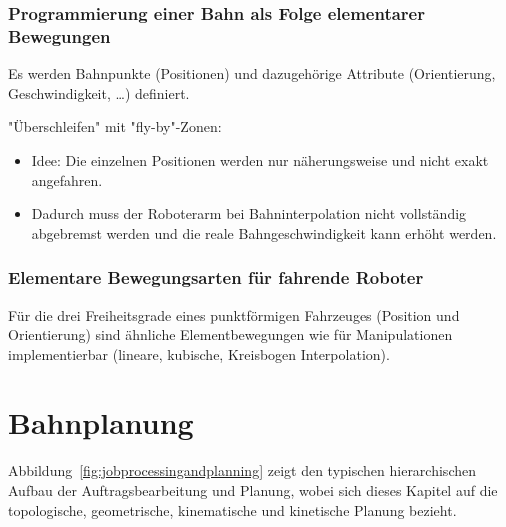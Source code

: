 		\subsection{Programmierung einer Bahn als Folge elementarer Bewegungen}
			Es werden Bahnpunkte (Positionen) und dazugehörige Attribute (Orientierung, Geschwindigkeit, \dots) definiert.

			"Überschleifen" mit "fly-by"-Zonen:
			\begin{itemize}
				\item Idee: Die einzelnen Positionen werden nur näherungsweise und nicht exakt angefahren.
				\item Dadurch muss der Roboterarm bei Bahninterpolation nicht vollständig abgebremst werden und die reale Bahngeschwindigkeit kann erhöht werden.
			\end{itemize}

		\subsection{Elementare Bewegungsarten für fahrende Roboter}
			Für die drei Freiheitsgrade eines punktförmigen Fahrzeuges (Position und Orientierung) sind ähnliche Elementbewegungen wie für Manipulationen implementierbar (lineare, kubische, Kreisbogen Interpolation).

\chapter{Bahnplanung}
	\label{c:bahnplanung}

	Abbildung~\ref{fig:jobprocessingandplanning} zeigt den typischen hierarchischen Aufbau der Auftragsbearbeitung und Planung, wobei sich dieses Kapitel auf die topologische, geometrische, kinematische und kinetische Planung bezieht.

